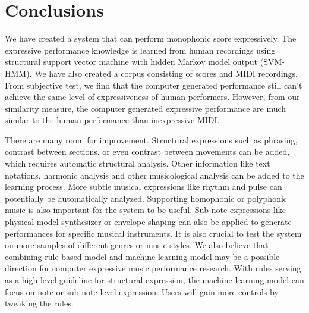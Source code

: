 \chapter{Conclusions}
We have created a system that can perform monophonic score expressively. The expressive performance knowledge is learned from human recordings using structural support vector machine with hidden Markov model output (SVM-HMM). We have also created a corpus consisting of scores and MIDI recordings.  From subjective test, we find that the computer generated performance still can't achieve the same level of expressiveness of human performers. However, from our similarity measure, the computer generated expressive performance are much similar to the human performance than inexpressive MIDI. %

There are many room for improvement. Structural expressions such as phrasing, contrast between sections, or even contrast between movements can be added, which requires automatic structural analysis. Other information like text notations, harmonic analysis and other musicological analysis can be added to the learning process. More subtle musical expressions like rhythm and pulse can potentially be automatically analyzed. Supporting homophonic or polyphonic music is also important for the system to be useful. Sub-note expressions like physical model synthesizer or envelope shaping can also be applied to generate performances for specific musical instruments. It is also crucial to test the system on more samples of different genres or music styles. We also believe that combining rule-based model and machine-learning model may be a possible direction for computer expressive music performance research. With rules serving as a high-level guideline for structural expression, the machine-learning model can focus on note or sub-note level expression. Users will gain more controls by tweaking the rules.


